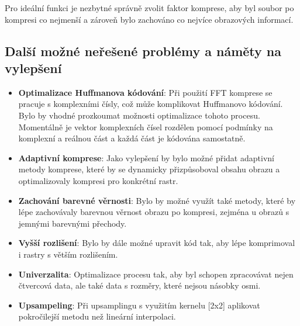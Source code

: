 Pro ideální funkci je nezbytné správně zvolit faktor komprese, aby byl soubor po kompresi co nejmenší a zároveň bylo zachováno co nejvíce obrazových informací.

\subsection{Další možné neřešené problémy a náměty na vylepšení}

\begin{itemize}
    \item \textbf{Optimalizace Huffmanova kódování}: Při použití FFT komprese se pracuje s komplexními čísly, což může komplikovat Huffmanovo kódování. Bylo by vhodné prozkoumat možnosti optimalizace tohoto procesu. Momentálně je vektor komplexních čísel rozdělen pomocí podmínky na komplexní a reálnou část a každá část je kódována samostatně.
    \item \textbf{Adaptivní komprese}: Jako vylepšení by bylo možné přidat adaptivní metody komprese, které by se dynamicky přizpůsoboval obsahu obrazu a optimalizovaly kompresi pro konkrétní rastr.
    \item \textbf{Zachování barevné věrnosti}: Bylo by možné využít také metody, které by lépe zachovávaly barevnou věrnost obrazu po kompresi, zejména u obrazů s jemnými barevnými přechody.
    \item \textbf{Vyšší rozlišení}: Bylo by dále možné upravit kód tak, aby lépe komprimoval i rastry s větším rozlišením.
    \item \textbf{Univerzalita}: Optimalizace procesu tak, aby byl schopen zpracovávat nejen čtvercová data, ale také data s rozměry, které nejsou násobky osmi.
    \item \textbf{Upsampeling}: Při upsamplingu s využitím kernelu [2x2] aplikovat pokročilejší metodu než lineární interpolaci.
\end{itemize}
